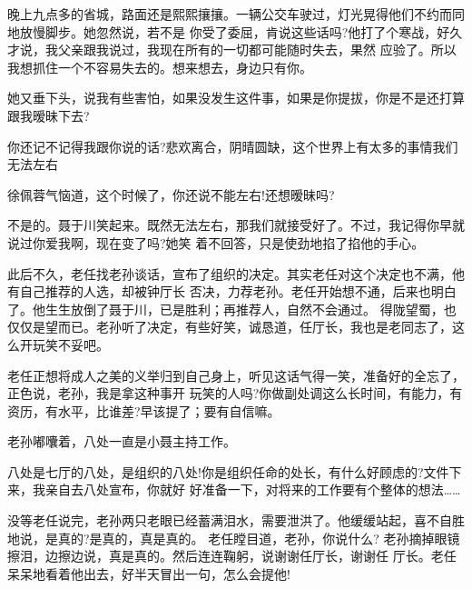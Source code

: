 \documentclass[11pt,a4paper,onecolumn]{article}
\begin{document}
晚上九点多的省城，路面还是熙熙攘攘。一辆公交车驶过，灯光晃得他们不约而同地放慢脚步。她忽然说，若不是
你受了委屈，肯说这些话吗?他打了个寒战，好久才说，我父亲跟我说过，我现在所有的一切都可能随时失去，果然
应验了。所以我想抓住一个不容易失去的。想来想去，身边只有你。

她又垂下头，说我有些害怕，如果没发生这件事，如果是你提拔，你是不是还打算跟我暧昧下去?

你还记不记得我跟你说的话?悲欢离合，阴晴圆缺，这个世界上有太多的事情我们无法左右\myrule{}

徐佩蓉气恼道，这个时候了，你还说不能左右!还想暧昧吗?

不是的。聂于川笑起来。既然无法左右，那我们就接受好了。不过，我记得你早就说过你爱我啊，现在变了吗?她笑
着不回答，只是使劲地掐了掐他的手心。

此后不久，老任找老孙谈话，宣布了组织的决定。其实老任对这个决定也不满，他有自己推荐的人选，却被钟厅长
否决，力荐老孙。老任开始想不通，后来也明白了。他生生放倒了聂于川，已是胜利；再推荐人，自然不会通过。
得陇望蜀，也仅仅是望而已。老孙听了决定，有些好笑，诚恳道，任厅长，我也是老同志了，这么开玩笑不妥吧。

老任正想将成人之美的义举归到自己身上，听见这话气得一笑，准备好的全忘了，正色说，老孙，我是拿这种事开
玩笑的人吗?你做副处调这么长时间，有能力，有资历，有水平，比谁差?早该提了；要有自信嘛。

老孙嘟囔着，八处一直是小聂主持工作。

八处是七厅的八处，是组织的八处!你是组织任命的处长，有什么好顾虑的?文件下来，我亲自去八处宣布，你就好
好准备一下，对将来的工作要有个整体的想法……

没等老任说完，老孙两只老眼已经蓄满泪水，需要泄洪了。他缓缓站起，喜不自胜地说，是真的?是真的，真是真的。
老任瞠目道，老孙，你说什么? 老孙摘掉眼镜擦泪，边擦边说，真是真的。然后连连鞠躬，说谢谢任厅长，谢谢任
厅长。老任呆呆地看着他出去，好半天冒出一句，怎么会提他!
\end{document}
